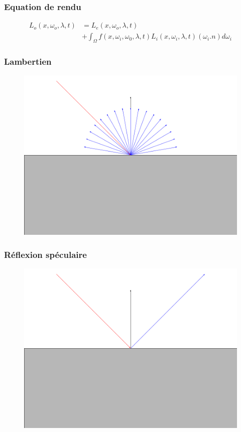 \documentclass[handout]{beamer}
\begin{document}
\begin{frame}

    \frametitle{Equation de rendu}

    \begin{align*}
        L_o(x, \omega_o, \lambda, t)
        &= L_e(x, \omega_o, \lambda, t) \\
        &+ \int_{\Omega}^{} f(x, \omega_i, \omega_0, \lambda, t)
        L_i(x, \omega_i, \lambda, t)
        (\omega_i . n) d\omega_i
    \end{align*}

\end{frame}

\begin{frame}
    \frametitle{Lambertien}
    \begin{figure}
        \includegraphics[scale=0.3]{Lambertian.png}
    \end{figure}
\end{frame}

\begin{frame}
    \frametitle{Réflexion spéculaire}
    \begin{figure}
        \includegraphics[scale=0.3]{Metal.png}
    \end{figure}
\end{frame}
\end{document}
